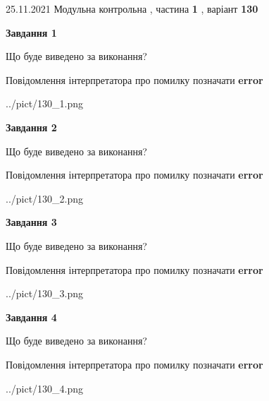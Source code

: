 \documentclass[10pt, ukrainian]{article}
\begin{document}
{25.11.2021 Модульна контрольна , частина \textbf { 1 }, варіант  \No \textbf { 130 }\par}
{
\begin {large}

{\begin {center}\textbf{Завдання 1}\end {center}}\par
Що буде виведено за виконання? \par
Повідомлення інтерпретатора про помилку позначати \textbf{error}

\begin{center}
	{../pict/130_1.png}
\end{center}
\newpage

{\begin {center}\textbf{Завдання 2}\end {center}}\par
Що буде виведено за виконання? \par
Повідомлення інтерпретатора про помилку позначати \textbf{error}

\begin{center}
	{../pict/130_2.png}
\end{center}
\newpage

{\begin {center}\textbf{Завдання 3}\end {center}}\par
Що буде виведено за виконання? \par
Повідомлення інтерпретатора про помилку позначати \textbf{error}

\begin{center}
	{../pict/130_3.png}
\end{center}
\newpage

{\begin {center}\textbf{Завдання 4}\end {center}}\par
Що буде виведено за виконання? \par
Повідомлення інтерпретатора про помилку позначати \textbf{error}

\begin{center}
	{../pict/130_4.png}
\end{center}
\newpage


\end{large}}
\end{document}
